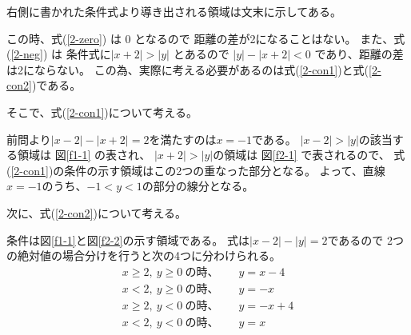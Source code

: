 \documentclass[12pt,b5paper]{ltjsarticle}
\begin{document}
\begin{enumerate}
      右側に書かれた条件式より導き出される領域は文末に示してある。

      この時、式(\ref{2-zero}) は 0 となるので 距離の差が2になることはない。
      また、式(\ref{2-neg}) は 条件式に$\lvert x + 2 \rvert > \lvert y \rvert$
      とあるので $\lvert y \rvert - \lvert x+2 \rvert<0$
      であり、距離の差は2にならない。
      この為、実際に考える必要があるのは式(\ref{2-con1})と式(\ref{2-con2})である。

      そこで、式(\ref{2-con1})について考える。
      
      前問より$\lvert x-2 \rvert - \lvert x+2 \rvert　=2$を満たすのは$x=-1$である。
      $\lvert x - 2\rvert > \lvert y \rvert$の該当する領域は
      図\ref{f1-1} の表され、
      $\lvert x + 2 \rvert > \lvert y \rvert$の領域は
      図\ref{f2-1} で表されるので、
      式(\ref{2-con1})の条件の示す領域はこの2つの重なった部分となる。
      よって、直線$x=-1$のうち、$-1< y < 1$の部分の線分となる。


      次に、式(\ref{2-con2})について考える。
      
      条件は図\ref{f1-1}と図\ref{f2-2}の示す領域である。
      式は$\lvert x-2 \rvert - \lvert y \rvert = 2$であるので
      2つの絶対値の場合分けを行うと次の4つに分わけられる。
      \begin{align}
       x\geq 2 ,\ y\geq 0\ の時、 &\quad y=x-4\\
       x< 2 ,\ y\geq 0\ の時、 &\quad y=-x\\
       x\geq 2 ,\ y< 0\ の時、 &\quad y=-x+4\\
       x< 2 ,\ y< 0\ の時、 &\quad y=x
      \end{align}


\end{enumerate}
\end{document}
